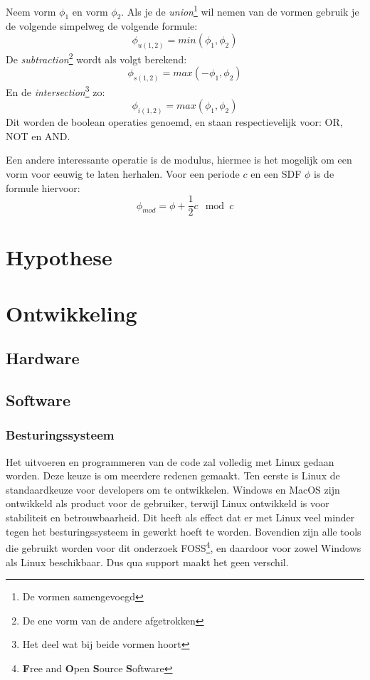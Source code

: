 \documentclass[12pt, a4paper]{article}
\begin{document}
Neem vorm $\phi_1$ en vorm $\phi_2$. Als je de \emph{union}\footnote{De vormen samengevoegd} wil nemen van de vormen gebruik je de volgende simpelweg de volgende formule: 
\[\phi_{u(1,2)}=min(\phi_1, \phi_2)\]
De \emph{subtraction}\footnote{De ene vorm van de andere afgetrokken} wordt als volgt berekend:
\[\phi_{s(1,2)}=max(-\phi_1, \phi_2)\]
En de \emph{intersection}\footnote{Het deel wat bij beide vormen hoort} zo:
\[\phi_{i(1,2)}=max(\phi_1, \phi_2)\]
Dit worden de boolean operaties genoemd, en staan respectievelijk voor: OR, NOT en AND.

Een andere interessante operatie is de modulus, hiermee is het mogelijk om een vorm voor eeuwig te laten herhalen. Voor een periode $c$ en een SDF $\phi$ is de formule hiervoor:
\[\phi_{mod}= \phi +\frac{1}{2}c\mod{c}\]

\clearpage
\section{Hypothese}
\clearpage
\section{Ontwikkeling}
\subsection{Hardware}
\subsection{Software}
\subsubsection{Besturingssysteem}
Het uitvoeren en programmeren van de code zal volledig met Linux gedaan worden. Deze keuze is om meerdere redenen gemaakt. Ten eerste is Linux de standaardkeuze voor developers om te ontwikkelen. Windows en MacOS zijn ontwikkeld als product voor de gebruiker, terwijl Linux ontwikkeld is voor stabiliteit en betrouwbaarheid. Dit heeft als effect dat er met Linux veel minder tegen het besturingssysteem in gewerkt hoeft te worden. Bovendien zijn alle tools die gebruikt worden voor dit onderzoek FOSS\footnote{\textbf{F}ree and \textbf{O}pen \textbf{S}ource \textbf{S}oftware}, en daardoor voor zowel Windows als Linux beschikbaar. Dus qua support maakt het geen verschil.
\end{document}

